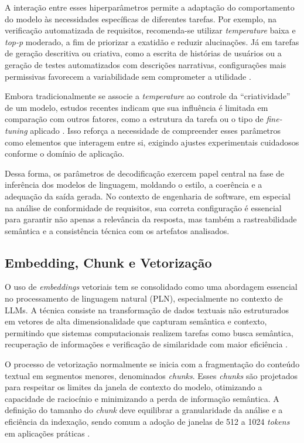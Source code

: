 A interação entre esses hiperparâmetros permite a adaptação do comportamento do modelo às necessidades específicas de diferentes tarefas. Por exemplo, na verificação automatizada de requisitos, recomenda-se utilizar \textit{temperature} baixa e \textit{top-p} moderado, a fim de priorizar a exatidão e reduzir alucinações. Já em tarefas de geração descritiva ou criativa, como a escrita de histórias de usuários ou a geração de testes automatizados com descrições narrativas, configurações mais permissivas favorecem a variabilidade sem comprometer a utilidade .

Embora tradicionalmente se associe a \textit{temperature} ao controle da “criatividade” de um modelo, estudos recentes indicam que sua influência é limitada em comparação com outros fatores, como a estrutura da tarefa ou o tipo de \textit{fine-tuning} aplicado . Isso reforça a necessidade de compreender esses parâmetros como elementos que interagem entre si, exigindo ajustes experimentais cuidadosos conforme o domínio de aplicação.

Dessa forma, os parâmetros de decodificação exercem papel central na fase de inferência dos modelos de linguagem, moldando o estilo, a coerência e a adequação da saída gerada. No contexto de engenharia de software, em especial na análise de conformidade de requisitos, sua correta configuração é essencial para garantir não apenas a relevância da resposta, mas também a rastreabilidade semântica e a consistência técnica com os artefatos analisados.

\subsection{Embedding, Chunk e Vetorização}

O uso de \textit{embeddings} vetoriais tem se consolidado como uma abordagem essencial no processamento de linguagem natural (PLN), especialmente no contexto de LLMs. A técnica consiste na transformação de dados textuais não estruturados em vetores de alta dimensionalidade que capturam semântica e contexto, permitindo que sistemas computacionais realizem tarefas como busca semântica, recuperação de informações e verificação de similaridade com maior eficiência .

O processo de vetorização normalmente se inicia com a fragmentação do conteúdo textual em segmentos menores, denominados \textit{chunks}. Esses \textit{chunks} são projetados para respeitar os limites da janela de contexto do modelo, otimizando a capacidade de raciocínio e minimizando a perda de informação semântica. A definição do tamanho do \textit{chunk} deve equilibrar a granularidade da análise e a eficiência da indexação, sendo comum a adoção de janelas de 512 a 1024 \textit{tokens} em aplicações práticas .

